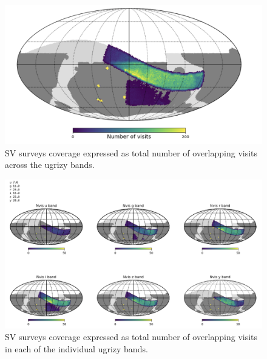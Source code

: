 \begin{figure}[htbp]
    \begin{center}
    \includegraphics[width=1\textwidth]{./sv_surveys_coverage.png}
    \caption{SV surveys coverage expressed as total number of overlapping visits across the ugrizy bands.}
    \label{sv_surveys_coverage_band}
    \end{center}
\end{figure}

\begin{figure}[htbp]
    \begin{center}
    \includegraphics[width=1\textwidth]{./sv_surveys_coverage_band.png}
    \caption{SV surveys coverage expressed as total number of overlapping visits in each of the individual ugrizy bands.}
    \label{sv_surveys_coverage_band}
    \end{center}
\end{figure}

